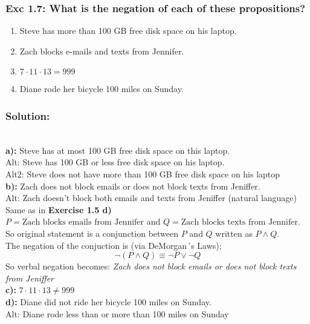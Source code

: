 \subsubsection*{Exc 1.7: What is the negation of each of these propositions?}
\begin{enumerate}[label=(\alph*)]
\item Steve has more than 100 GB free disk space on his
laptop.
\item Zach blocks e-mails and texts from Jennifer.
\item $7 \cdot 11 \cdot 13 = 999$
\item Diane rode her bicycle 100 miles on Sunday.
\end{enumerate}
\subsubsection*{Solution:}
\\
\textbf{a):} Steve has at most 100 GB free disk space on this laptop.
\\ Alt: Steve has 100 GB or less free disk space on his laptop.
\\ Alt2: Steve does not have more than 100 GB free disk space on his laptop
\\
\textbf{b):} Zach does not block emails or does not block texts from Jeniffer.
\\ Alt: Zach doesn’t block both emails and texts from Jeniffer (natural language)
\\ Same as in \textbf{Exercise 1.5 d)}
\\ $P = \text{Zach blocks emails from Jennifer}$ and  $Q = \text{Zach blocks texts from Jennifer}$. So original statement is a conjunction between $P$ and $Q$ written as $P \land Q$. 
\\ The negation of the conjuction is (via DeMorgan´s Laws);
\begin{equation*}
\neg (P \land Q) \equiv \neg P \lor \neg Q    
\end{equation*}
So verbal negation becomes: \textit{Zach does not block emails or does not block texts from Jeniffer}
\\
\textbf{c):} $7 \cdot 11 \cdot 13 \neq 999$
\\
\textbf{d):} Diane did not ride her bicycle 100 miles on Sunday.
\\ Alt: Diane rode less than or more than 100 miles on Sunday 

